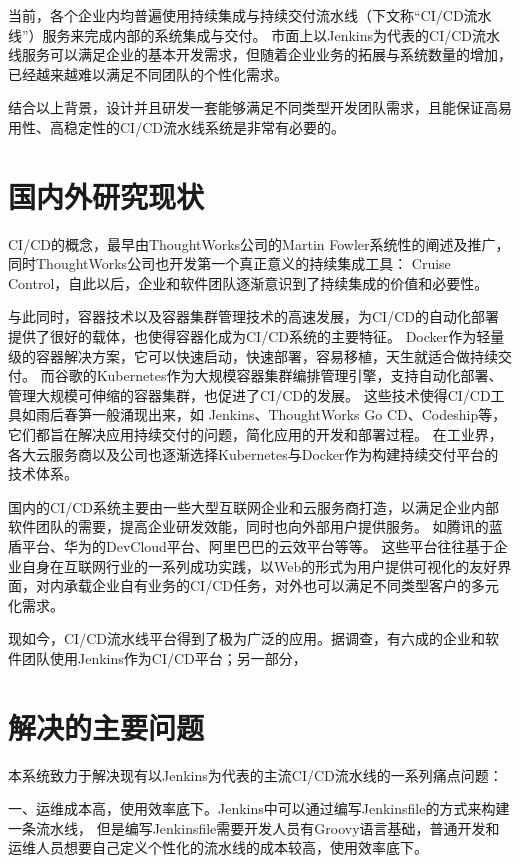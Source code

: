 当前，各个企业内均普遍使用持续集成与持续交付流水线（下文称“CI/CD流水线”）服务来完成内部的系统集成与交付。
市面上以Jenkins为代表的CI/CD流水线服务可以满足企业的基本开发需求，但随着企业业务的拓展与系统数量的增加，已经越来越难以满足不同团队的个性化需求。

结合以上背景，设计并且研发一套能够满足不同类型开发团队需求，且能保证高易用性、高稳定性的CI/CD流水线系统是非常有必要的。


\section{国内外研究现状}
CI/CD的概念，最早由ThoughtWorks公司的Martin Fowler系统性的阐述及推广\cite{CI首作}，同时ThoughtWorks公司也开发第一个真正意义的持续集成工具：
Cruise Control\cite{绪论持续集成1}，自此以后，企业和软件团队逐渐意识到了持续集成的价值和必要性。

与此同时，容器技术以及容器集群管理技术的高速发展，为CI/CD的自动化部署提供了很好的载体\cite{docker}，也使得容器化成为CI/CD系统的主要特征。
Docker作为轻量级的容器解决方案，它可以快速启动，快速部署，容易移植，天生就适合做持续交付。
而谷歌的Kubernetes作为大规模容器集群编排管理引擎，支持自动化部署、管理大规模可伸缩的容器集群，也促进了CI/CD的发展。
这些技术使得CI/CD工具如雨后春笋一般涌现出来，如 Jenkins、ThoughtWorks Go CD、Codeship等，它们都旨在解决应用持续交付的问题，简化应用的开发和部署过程。
在工业界，各大云服务商以及公司也逐渐选择Kubernetes与Docker作为构建持续交付平台的技术体系。




国内的CI/CD系统主要由一些大型互联网企业和云服务商打造，以满足企业内部软件团队的需要，提高企业研发效能，同时也向外部用户提供服务。
如腾讯的蓝盾平台、华为的DevCloud平台、阿里巴巴的云效平台等等。
这些平台往往基于企业自身在互联网行业的一系列成功实践，以Web的形式为用户提供可视化的友好界面，对内承载企业自有业务的CI/CD任务，对外也可以满足不同类型客户的多元化需求。

现如今，CI/CD流水线平台得到了极为广泛的应用。据调查，有六成的企业和软件团队使用Jenkins作为CI/CD平台\cite{DevOps中国调查研究}；另一部分，




\section{解决的主要问题}
本系统致力于解决现有以Jenkins为代表的主流CI/CD流水线的一系列痛点问题：

一、运维成本高，使用效率底下。Jenkins中可以通过编写Jenkinsfile的方式来构建一条流水线，
但是编写Jenkinsfile需要开发人员有Groovy语言基础，普通开发和运维人员想要自己定义个性化的流水线的成本较高，使用效率底下。

